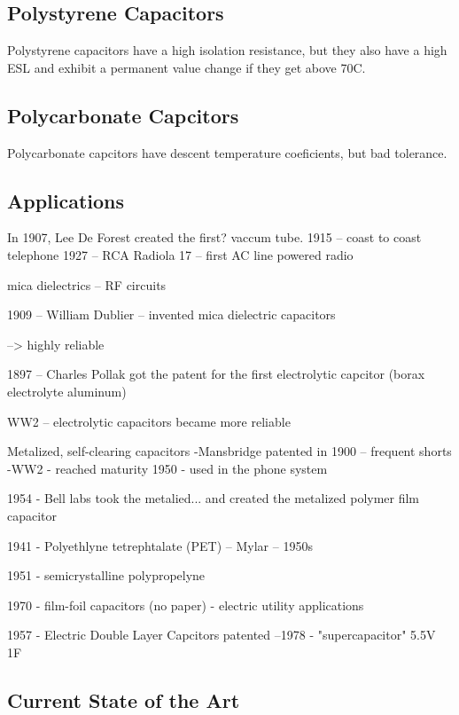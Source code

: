 \subsection{Polystyrene Capacitors}

Polystyrene capacitors have a high isolation resistance, but they also have a high ESL and exhibit a permanent value change if they get above 70C.
\cite{learn_caps}

\subsection{Polycarbonate Capcitors}

Polycarbonate capcitors have descent temperature coeficients, but bad tolerance.  \cite{learn_caps}

\subsection{Applications}

In 1907, Lee De Forest created the first? vaccum tube. \cite{deis_hist}
1915 -- coast to coast telephone
1927 -- RCA Radiola 17 -- first AC line powered radio

mica dielectrics -- RF circuits


1909 -- William Dublier -- invented mica dielectric capacitors


--> highly reliable


1897 -- Charles Pollak got the patent for the first electrolytic capcitor (borax electrolyte aluminum)

WW2 -- electrolytic capacitors became more reliable


Metalized, self-clearing capacitors
-Mansbridge patented in 1900 -- frequent shorts
-WW2 - reached maturity
1950 - used in the phone system

1954 - Bell labs took the metalied... and created the metalized polymer film capacitor

1941 - Polyethlyne  tetrephtalate (PET) -- Mylar -- 1950s

1951 -  semicrystalline polypropelyne 

1970 - film-foil capacitors (no paper) - electric utility applications

1957 - Electric Double Layer Capcitors patented
--1978  - "supercapacitor" 5.5V 1F \cite{deis_hist}

\subsection{Current State of the Art}

